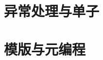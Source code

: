 \documentclass[lang=cn, scheme=chinese, 10pt]{elegantbook}
\begin{document}
\chapter{异常处理与单子}


%

\chapter{模版与元编程}


%



%


%



\appendix
%
\end{document}
